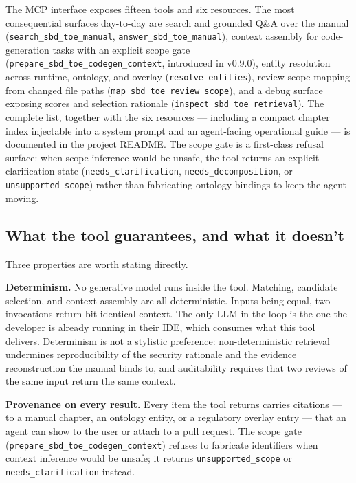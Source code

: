 \documentclass[conference]{IEEEtran}
\begin{document}
The MCP interface exposes fifteen tools and six resources. The most
consequential surfaces day-to-day are search and grounded Q\&A over the
manual (\texttt{search\_sbd\_toe\_manual},
\texttt{answer\_sbd\_toe\_manual}), context assembly for code-generation
tasks with an explicit scope gate
(\texttt{prepare\_sbd\_toe\_codegen\_context}, introduced in v0.9.0),
entity resolution across runtime, ontology, and overlay
(\texttt{resolve\_entities}), review-scope mapping from changed file
paths (\texttt{map\_sbd\_toe\_review\_scope}), and a debug surface
exposing scores and selection rationale
(\texttt{inspect\_sbd\_toe\_retrieval}). The complete list, together
with the six resources --- including a compact chapter index injectable
into a system prompt and an agent-facing operational guide --- is
documented in the project README. The scope gate is a first-class
refusal surface: when scope inference would be unsafe, the tool returns
an explicit clarification state (\texttt{needs\_clarification},
\texttt{needs\_decomposition}, or \texttt{unsupported\_scope}) rather
than fabricating ontology bindings to keep the agent moving.

\subsection{What the tool guarantees, and what it
doesn't}\label{what-the-tool-guarantees-and-what-it-doesnt}

Three properties are worth stating directly.

\textbf{Determinism.} No generative model runs inside the tool.
Matching, candidate selection, and context assembly are all
deterministic. Inputs being equal, two invocations return bit-identical
context. The only LLM in the loop is the one the developer is already
running in their IDE, which consumes what this tool delivers.
Determinism is not a stylistic preference: non-deterministic retrieval
undermines reproducibility of the security rationale and the evidence
reconstruction the manual binds to, and auditability requires that two
reviews of the same input return the same context.

\textbf{Provenance on every result.} Every item the tool returns carries
citations --- to a manual chapter, an ontology entity, or a regulatory
overlay entry --- that an agent can show to the user or attach to a pull
request. The scope gate (\texttt{prepare\_sbd\_toe\_codegen\_context})
refuses to fabricate identifiers when context inference would be unsafe;
it returns \texttt{unsupported\_scope} or \texttt{needs\_clarification}
instead.
\end{document}
